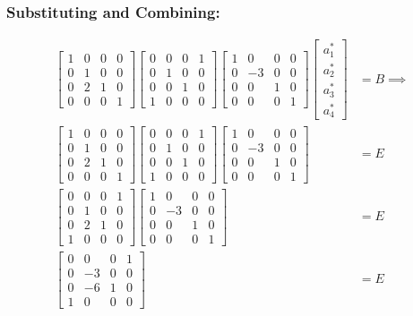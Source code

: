 \documentclass[fleqn]{article}
\begin{document}
\subsubsection*{Substituting and Combining:}
\begin{equation*}
\begin{split}
    \begin{bmatrix}1&0&0&0\\0&1&0&0\\0&2&1&0\\0&0&0&1\end{bmatrix}\begin{bmatrix}0&0&0&1\\0&1&0&0\\0&0&1&0\\1&0&0&0\end{bmatrix}\begin{bmatrix}1&0&0&0\\0&-3&0&0\\0&0&1&0\\0&0&0&1\end{bmatrix}\begin{bmatrix}a^{*}_1\\a^{*}_2\\a^{*}_3\\a^{*}_4\end{bmatrix} &= B \implies \\
    \begin{bmatrix}1&0&0&0\\0&1&0&0\\0&2&1&0\\0&0&0&1\end{bmatrix}\begin{bmatrix}0&0&0&1\\0&1&0&0\\0&0&1&0\\1&0&0&0\end{bmatrix}\begin{bmatrix}1&0&0&0\\0&-3&0&0\\0&0&1&0\\0&0&0&1\end{bmatrix} &= E\\
    \begin{bmatrix}0&0&0&1\\0&1&0&0\\0&2&1&0\\1&0&0&0\end{bmatrix}\begin{bmatrix}1&0&0&0\\0&-3&0&0\\0&0&1&0\\0&0&0&1\end{bmatrix} &= E\\
    \begin{bmatrix}0&0&0&1\\0&-3&0&0\\0&-6&1&0\\1&0&0&0\end{bmatrix} &= E\\
\end{split}
\end{equation*}
\end{document}
